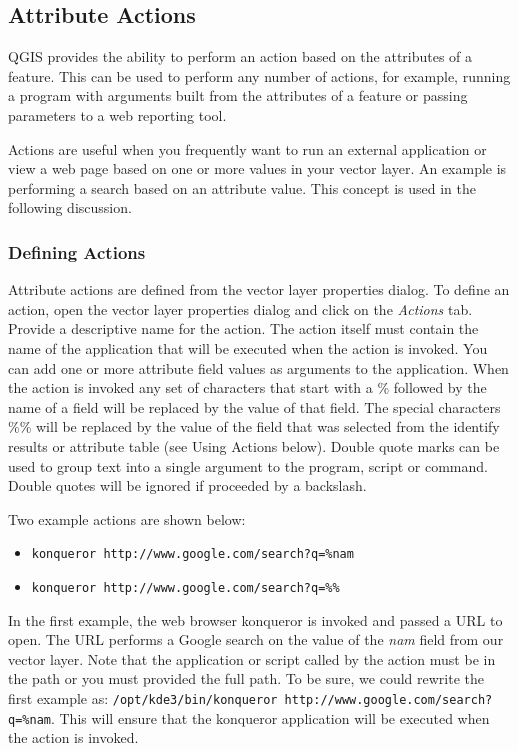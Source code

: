 \subsection{Attribute Actions}\label{label_actions}

QGIS provides the ability to perform an action based on the attributes of a
feature. This can be used to perform any number of actions, for example,
running a program with arguments built from the attributes of a feature or
passing parameters to a web reporting tool.

Actions are useful when you frequently want to run an external application or
view a web page based on one or more values in your vector layer. An example
is
performing a search based on an attribute value. This concept is used in the
following discussion.

\subsubsection{Defining Actions}

Attribute actions are defined from the vector layer properties dialog. To
define
an action, open the vector layer properties dialog and click on the
\textit{Actions} tab. Provide a descriptive name for the action. The action
itself must contain the name of the application that will be executed when the
action is invoked. You can add one or more attribute field values as arguments
to the application. When the action is invoked any set of characters that
start
with a \% followed by the name of a field will be replaced by the value of
that
field.  The special characters \%\% \index{\%\%}will be replaced by the value
of
the field that was selected from the identify results or attribute table (see
Using Actions below).  Double quote marks can be used to group text into a
single argument to the program, script or command. Double quotes will be
ignored
if proceeded by a backslash.  

Two example actions are shown below:

\begin{itemize}
  \item \texttt{konqueror http://www.google.com/search?q=\%nam}
  \item \texttt{konqueror http://www.google.com/search?q=\%\%}
\end{itemize}

In the first example, the web browser konqueror is invoked and passed a URL to
open. The URL performs a Google search on the value of the \textit{nam} field
from our vector layer. Note that the application or script called by the
action
must be in the path or you must provided the full path. To be sure, we could
rewrite the first example as: \texttt{/opt/kde3/bin/konqueror
http://www.google.com/search?q=\%nam}. This will ensure that the konqueror
application will be executed when the action is invoked.

